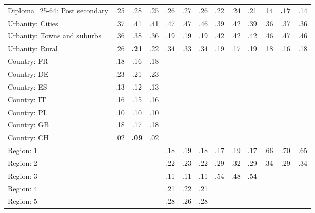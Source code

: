 \begin{tabular}[t]{lcccccccccccc}
Diploma\_25-64: Post secondary & .25 & .28 & .25 & .26 & .27 & .26 & .22 & .24 & .21 & .14 & \textbf{.17} & .14\\
\addlinespace
Urbanity: Cities & .37 & .41 & .41 & .47 & .47 & .46 & .39 & .42 & .39 & .36 & .37 & .36\\
Urbanity: Towns and suburbs & .36 & .38 & .36 & .19 & .19 & .19 & .42 & .42 & .42 & .46 & .47 & .46\\
Urbanity: Rural & .26 & \textbf{.21} & .22 & .34 & .33 & .34 & .19 & .17 & .19 & .18 & .16 & .18\\
\addlinespace
Country: FR & .18 & .16 & .18 &  &  &  &  &  &  &  &  & \\
Country: DE & .23 & .21 & .23 &  &  &  &  &  &  &  &  & \\
Country: ES & .13 & .12 & .13 &  &  &  &  &  &  &  &  & \\
Country: IT & .16 & .15 & .16 &  &  &  &  &  &  &  &  & \\
Country: PL & .10 & .10 & .10 &  &  &  &  &  &  &  &  & \\
Country: GB & .18 & .17 & .18 &  &  &  &  &  &  &  &  & \\
Country: CH & .02 & \textbf{.09} & .02 &  &  &  &  &  &  &  &  & \\
\addlinespace
Region: 1 &  &  &  & .18 & .19 & .18 & .17 & .19 & .17 & .66 & .70 & .65\\
Region: 2 &  &  &  & .22 & .23 & .22 & .29 & .32 & .29 & .34 & .29 & .34\\
Region: 3 &  &  &  & .11 & .11 & .11 & .54 & .48 & .54 &  &  & \\
Region: 4 &  &  &  & .21 & .22 & .21 &  &  &  &  &  & \\
Region: 5 &  &  &  & .28 & .26 & .28 &  &  &  &  &  & \\
\bottomrule
\end{tabular}